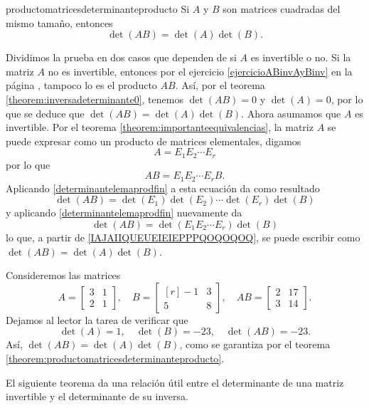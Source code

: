 \newpage

\begin{theorem}{}{productomatricesdeterminanteproducto}
    Si $A$ y $B$ son matrices cuadradas del mismo tamaño, entonces
    $$\det(AB) = \det(A) \det(B).$$

    \tcblower
    \demostracion Dividimos la prueba en dos casos que dependen de si $A$ es invertible o no. Si la matriz $A$ no es invertible, entonces por el ejercicio \ref{ejercicioABinvAyBinv} en la página \pageref{ejercicioABinvAyBinv}, tampoco lo es el producto $AB$. Así, por el teorema \ref{theorem:inversadeterminante0}, tenemos $\det(AB) = 0$ y $\det(A) = 0$, por lo que se deduce que $\det(AB) = \det(A) \det(B)$. Ahora asumamos que $A$ es invertible. Por el teorema \ref{theorem:importanteequivalencias}, la matriz $A$ se puede expresar como un producto de matrices elementales, digamos
    \begin{equation}
        A = E_1 E_2 \cdots E_r \label{IAJAIIQUEUEIEIEPPPQOQOQOQ}
    \end{equation}
    por lo que
    $$AB = E_1 E_2 \cdots E_r B.$$
    Aplicando \eqref{determinantelemaprodfin} a esta ecuación da como resultado
    $$\det(AB) = \det(E_1) \det(E_2) \cdots \det(E_r) \det(B)$$
    y aplicando \eqref{determinantelemaprodfin} nuevamente da
    $$\det(AB) = \det(E_1 E_2 \cdots E_r) \det(B)$$
    lo que, a partir de \eqref{IAJAIIQUEUEIEIEPPPQOQOQOQ}, se puede escribir como $\det(AB) = \det(A) \det(B)$.
\end{theorem}

\begin{examplebox}{}{}
    Consideremos las matrices
    $$A = \begin{bmatrix} 3 & 1 \\ 2 & 1 \end{bmatrix}, \quad B = \begin{bmatrix*}[r] -1 & 3 \\ 5 & 8 \end{bmatrix*}, \quad AB = \begin{bmatrix} 2 & 17 \\ 3 & 14 \end{bmatrix}.$$
    Dejamos al lector la tarea de verificar que
    $$\det(A) = 1, \quad \det(B) = -23, \quad \det(AB) = -23.$$
    Así, $\det(AB) = \det(A) \det(B)$, como se garantiza por el teorema \ref{theorem:productomatricesdeterminanteproducto}.
\end{examplebox}

El siguiente teorema da una relación útil entre el determinante de una matriz invertible y el determinante de su inversa.

